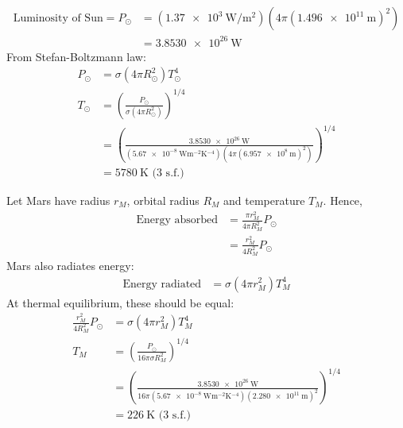 \begin{solution}
    \begin{subsolution}
        \begin{align*}
            \text{Luminosity of Sun}=P_{\odot}&=(\qty{1.37e3}{\W\per\square\m})(4\pi(\qty{1.496e11}{\m})^2)\\
            &=\qty{3.8530e26}{\W}
        \end{align*}
        From Stefan-Boltzmann law:
        \begin{align*}
            P_{\odot}&=\sigma(4\pi R_{\odot}^2)T_{\odot}^4\\
            T_{\odot}&=\left(\frac{P_{\odot}}{\sigma(4\pi R_{\odot}^2)}\right)^{1/4}\\
            &=\left(\frac{\qty{3.8530e26}{\W}}{(\qty{5.67e-8}{\W\m^{-2}\K^{-4}})(4\pi(\qty{6.957e8}{\m})^2)}\right)^{1/4}\\
            &=\boxed{\qty{5780}{\K}}\text{ (3 s.f.)}
        \end{align*}
    \end{subsolution}
    
    \begin{subsolution}
        Let Mars have radius $r_M$, orbital radius $R_M$ and temperature $T_M$. Hence,
        \begin{align*}
            \text{Energy absorbed}&=\frac{\pi r_M^2}{4\pi R_M^2}P_{\odot}\\
            &=\frac{r_M^2}{4 R_M^2}P_{\odot}
        \end{align*}
        Mars also radiates energy:
        \begin{align*}
            \text{Energy radiated}&=\sigma(4\pi r_M^2)T_M^4
        \end{align*}
        At thermal equilibrium, these should be equal:
        \begin{align*}
            \frac{r_M^2}{4 R_M^2}P_{\odot}&=\sigma(4\pi r_M^2)T_M^4\\
            T_M&=\left(\frac{P_{\odot}}{16\pi\sigma R_M^2}\right)^{1/4}\\
            &=\left(\frac{\qty{3.8530e26}{\W}}{16\pi(\qty{5.67e-8}{\W\m^{-2}\K^{-4}})(\qty{2.280e11}{\m})^2}\right)^{1/4}\\
            &=\boxed{\qty{226}{\K}}\text{ (3 s.f.)}
        \end{align*}
    \end{subsolution}
\end{solution}

